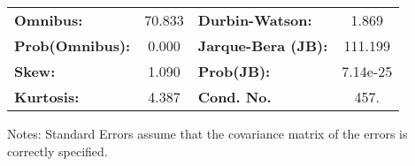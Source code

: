 \documentclass{report}
\begin{document}
\begin{center}
\begin{tabular}{lcccccc}
\bottomrule
\end{tabular}
\begin{tabular}{lclc}
\textbf{Omnibus:}       & 70.833 & \textbf{  Durbin-Watson:     } &    1.869  \\
\textbf{Prob(Omnibus):} &  0.000 & \textbf{  Jarque-Bera (JB):  } &  111.199  \\
\textbf{Skew:}          &  1.090 & \textbf{  Prob(JB):          } & 7.14e-25  \\
\textbf{Kurtosis:}      &  4.387 & \textbf{  Cond. No.          } &     457.  \\
\bottomrule
\end{tabular}
\end{center}

Notes: \newline
 [1] Standard Errors assume that the covariance matrix of the errors is correctly specified.
\end{document}
